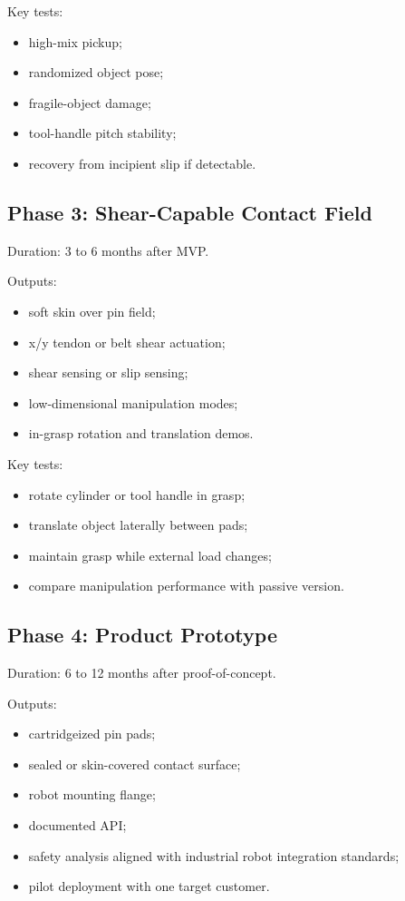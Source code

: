 \documentclass[11pt]{article}
\begin{document}
Key tests:

\begin{itemize}[leftmargin=*]
  \item high-mix pickup;
  \item randomized object pose;
  \item fragile-object damage;
  \item tool-handle pitch stability;
  \item recovery from incipient slip if detectable.
\end{itemize}

\subsection{Phase 3: Shear-Capable Contact Field}

Duration: 3 to 6 months after MVP.

Outputs:

\begin{itemize}[leftmargin=*]
  \item soft skin over pin field;
  \item x/y tendon or belt shear actuation;
  \item shear sensing or slip sensing;
  \item low-dimensional manipulation modes;
  \item in-grasp rotation and translation demos.
\end{itemize}

Key tests:

\begin{itemize}[leftmargin=*]
  \item rotate cylinder or tool handle in grasp;
  \item translate object laterally between pads;
  \item maintain grasp while external load changes;
  \item compare manipulation performance with passive version.
\end{itemize}

\subsection{Phase 4: Product Prototype}

Duration: 6 to 12 months after proof-of-concept.

Outputs:

\begin{itemize}[leftmargin=*]
  \item cartridgeized pin pads;
  \item sealed or skin-covered contact surface;
  \item robot mounting flange;
  \item documented API;
  \item safety analysis aligned with industrial robot integration standards;
  \item pilot deployment with one target customer.
\end{itemize}
\end{document}
